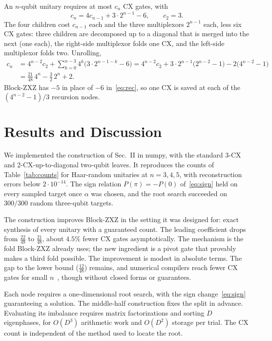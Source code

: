 \documentclass[11pt]{article}
\begin{document}
An $n$-qubit unitary requires at most $c_n$ CX gates, with
\begin{equation}\label{eq:rec}
c_n= 4c_{n-1}+3\cdot2^{n-1}-6 ,\qquad c_2=3 .
\end{equation}
The four children cost $c_{n-1}$ each and the three multiplexors $2^{n-1}$ each, less six CX gates:
three children are decomposed up to a diagonal that is merged into the next (one each), the
right-side multiplexor folds one CX, and the left-side multiplexor folds two. Unrolling,
\begin{align*}
c_n&= 4^{n-2}c_2+\sum_{k=0}^{n-3}4^k\big(3\cdot2^{n-1-k}-6\big)
= 4^{n-2}c_2+3\cdot2^{n-1}\big(2^{n-2}-1\big)-2\big(4^{n-2}-1\big)\\
&=\frac{21}{48}\,4^n-\frac32\,2^n+2 .
\end{align*}
Block-ZXZ has $-5$ in place of $-6$ in~\eqref{eq:rec}, so one CX is saved at each of the
$(4^{n-2}-1)/3$ recursion nodes.

\section{Results and Discussion}\label{sec:res}

We implemented the construction of Sec.~II in numpy, with the standard 3-CX and
2-CX-up-to-diagonal two-qubit leaves. It reproduces the counts of Table~\ref{tab:counts} for
Haar-random unitaries at $n=3,4,5$, with reconstruction errors below $2\cdot10^{-14}$. The sign
relation $P(\pi)=-P(0)$ of~\eqref{eq:sign} held on every sampled target once $\alpha$ was chosen,
and the root search succeeded on $300/300$ random three-qubit targets.

The construction improves Block-ZXZ in the setting it was designed for: exact synthesis of every
unitary with a guaranteed count. The leading coefficient drops from $\tfrac{22}{48}$ to
$\tfrac{21}{48}$, about $4.5\%$ fewer CX gates asymptotically. The mechanism is the fold Block-ZXZ
already uses; the new ingredient is a pivot gate that provably makes a third fold possible. The
improvement is modest in absolute terms. The gap to the lower bound ($\tfrac{12}{48}$) remains,
and numerical compilers reach fewer CX gates for small $n$~\cite{brickwall,squander}, though
without closed forms or guarantees.

Each node requires a one-dimensional root search, with the sign change~\eqref{eq:sign}
guaranteeing a solution. The middle-half construction fixes the split in advance. Evaluating
its imbalance requires matrix factorizations and sorting $D$ eigenphases, for $O(D^3)$
arithmetic work and $O(D^2)$ storage per trial. The CX count is independent of the method
used to locate the root.
\end{document}
